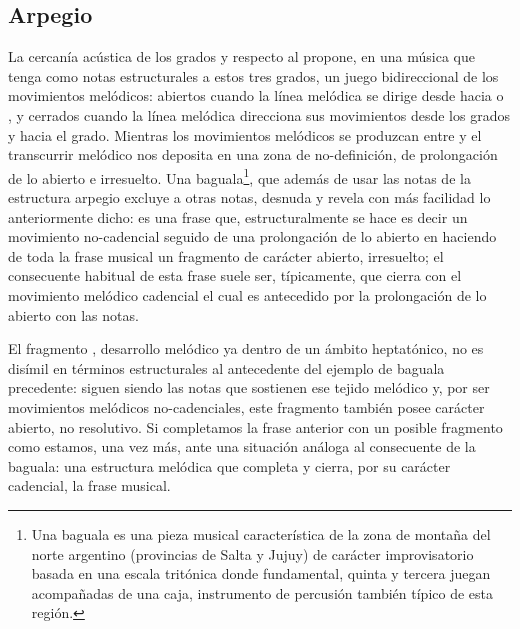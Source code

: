 \documentclass[a4paper,11pt]{article}
\begin{document}
\begin{multicols}{2}
  \subsection{Arpegio}\label{subsec:arpegio}
  La cercanía acústica de los grados  y  respecto al  propone, en una música que tenga como notas estructurales a estos tres grados, un juego bidireccional de los movimientos melódicos: abiertos cuando la línea melódica se dirige desde  hacia  o , y cerrados cuando la línea melódica direcciona sus movimientos desde los grados  y  hacia el  grado. Mientras los movimientos melódicos se produzcan entre  y  el transcurrir melódico nos deposita en una zona de no-definición, de prolongación de lo abierto e irresuelto. Una baguala\footnote{Una baguala es una pieza musical característica de la zona de montaña del norte argentino (provincias de Salta y Jujuy) de carácter improvisatorio basada en una escala tritónica donde fundamental, quinta y tercera juegan acompañadas de una caja, instrumento de percusión también típico de esta región.}, que además de usar las notas de la estructura arpegio excluye a otras notas, desnuda y revela con más facilidad lo anteriormente dicho:  es una frase que, estructuralmente se hace  es decir un movimiento no-cadencial  seguido de una prolongación de lo abierto en  haciendo de toda la frase musical un fragmento de carácter abierto, irresuelto; el consecuente habitual de esta frase suele ser, típicamente,  que cierra con el movimiento melódico cadencial  el cual es antecedido por la prolongación de lo abierto con las notas\hbox{.}

  El fragmento , desarrollo melódico ya dentro de un ámbito heptatónico, no es disímil en términos estructurales al antecedente del ejemplo de baguala precedente:  siguen siendo las notas que sostienen ese tejido melódico y, por ser movimientos melódicos no-cadenciales, este fragmento también posee carácter abierto, no resolutivo. Si completamos la frase anterior con un posible fragmento como  estamos, una vez más, ante una situación análoga al consecuente de la baguala: una estructura melódica  que completa y cierra, por su carácter cadencial, la frase musical.


\end{multicols}
\end{document}
